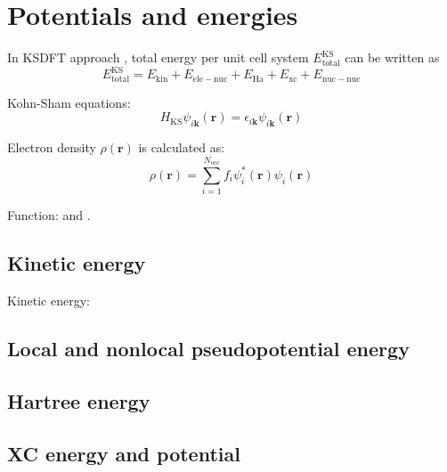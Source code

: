 \section{Potentials and energies}

In KSDFT approach \cite{Hohenberg1964,Kohn1965}, total energy per unit cell system
$E^{\mathrm{KS}}_{\mathrm{total}}$ can be written as
\begin{equation}
E^{\mathrm{KS}}_{\mathrm{total}} =
E_{\mathrm{kin}} + E_{\mathrm{ele-nuc}} +
E_{\mathrm{Ha}} + E_{\mathrm{xc}} + E_{\mathrm{nuc-nuc}}
\label{eq:E_KS_total}
\end{equation}

Kohn-Sham equations:
\begin{equation}
H_{\mathrm{KS}} \psi_{i\mathbf{k}}(\mathbf{r}) =
\epsilon_{i\mathbf{k}} \psi_{i\mathbf{k}}(\mathbf{r})
\end{equation}






Electron density $\rho(\mathbf{r})$ is calculated as:
\begin{equation}
\rho(\mathbf{r}) = \sum_{i=1}^{N_{\mathrm{occ}}} f_{i} \psi^{*}_{i}(\mathbf{r})
\psi_{i}(\mathbf{r})
\end{equation}

Function:  and .

\subsection{Kinetic energy}

Kinetic energy:



\subsection{Local and nonlocal pseudopotential energy}


\subsection{Hartree energy}


\subsection{XC energy and potential}

